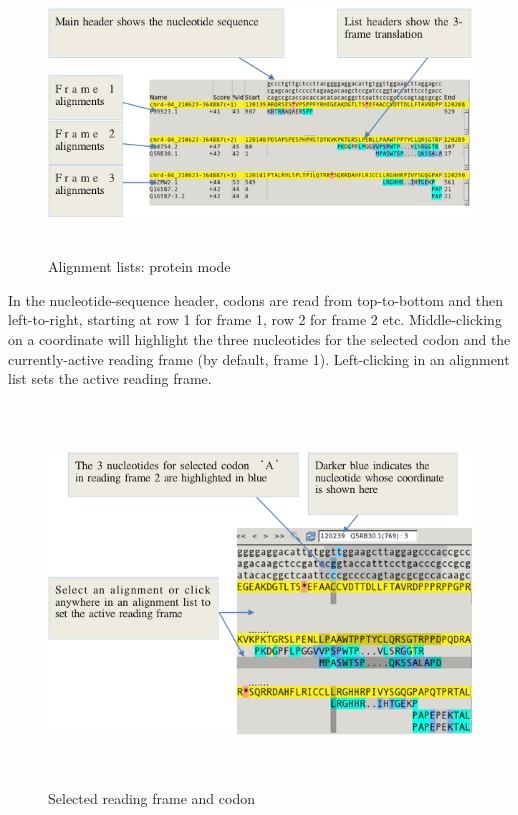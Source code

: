\documentclass[letterpaper]{article}
\begin{document}
\begin{figure}
\centering
\color[rgb]{0.30980393,0.5058824,0.7411765}
\includegraphics[width=14.974cm,height=7.396cm]{img_view_alignment_details_protein.png}
\caption{Alignment lists: protein mode}
\end{figure}

\bigskip

{In the nucleotide-sequence header, codons are read from top-to-bottom
and then left-to-right, starting at row 1 for frame 1, row 2 for frame
2 etc. Middle-clicking on a coordinate will highlight the three
nucleotides for the selected codon and the currently-active reading
frame (by default, frame 1). Left-clicking in an alignment list sets
the active reading frame.}

\begin{figure}
\centering
\color[rgb]{0.30980393,0.5058824,0.7411765}
\includegraphics[width=15.177cm,height=10.1cm]{img_view_reading_frame.png}
\caption{Selected reading frame and codon}
\end{figure}
\end{document}
